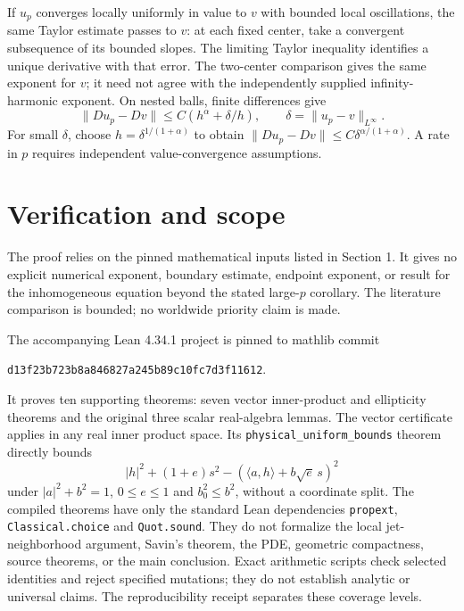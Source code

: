 \documentclass[11pt]{article}
\theoremstyle{remark}\newtheorem{remark}[theorem]{Remark}
\begin{document}
If $u_p$ converges locally uniformly in value to $v$ with bounded
local oscillations, the same Taylor estimate passes to $v$: at each
fixed center, take a convergent subsequence of its bounded slopes.
The limiting Taylor inequality identifies a unique derivative with
that error. The two-center comparison gives the same exponent for
$v$; it need not agree with the independently supplied
infinity-harmonic exponent. On nested balls, finite differences give
\[
 \|Du_p-Dv\|\leq C(h^\alpha+\delta/h),
 \qquad\delta=\|u_p-v\|_{L^\infty}.
\]
For small $\delta$, choose $h=\delta^{1/(1+\alpha)}$ to obtain
$\|Du_p-Dv\|\leq C\delta^{\alpha/(1+\alpha)}$. A rate in $p$ requires
independent value-convergence assumptions.

\section{Verification and scope}

The proof relies on the pinned mathematical inputs listed in Section 1.
It gives no explicit numerical exponent, boundary estimate, endpoint
exponent, or result for the inhomogeneous equation beyond the stated
large-$p$ corollary. The literature comparison is bounded; no worldwide
priority claim is made.

\begin{samepage}
The accompanying Lean 4.34.1 project is pinned to mathlib commit
\begin{center}\texttt{d13f23b723b8a846827a245b89c10fc7d3f11612}.\end{center}
\end{samepage}
It proves ten supporting theorems: seven vector inner-product and
ellipticity theorems and the original three scalar real-algebra
lemmas. The vector certificate applies in any real inner product
space. Its \texttt{physical\_uniform\_bounds} theorem directly bounds
\[
 |h|^2+(1+e)s^2-(\langle a,h\rangle+b\sqrt e\,s)^2
\]
under $|a|^2+b^2=1$, $0\leq e\leq1$ and $b_0^2\leq b^2$,
without a coordinate split. The compiled theorems have only the
standard Lean dependencies \texttt{propext},
\texttt{Classical.choice} and \texttt{Quot.sound}. They do not
formalize the local jet-neighborhood argument, Savin's theorem,
the PDE, geometric compactness, source theorems, or the main
conclusion. Exact arithmetic scripts check
selected identities and reject specified mutations; they do not
establish analytic or universal claims. The reproducibility receipt
separates these coverage levels.

\appendix


\end{document}
